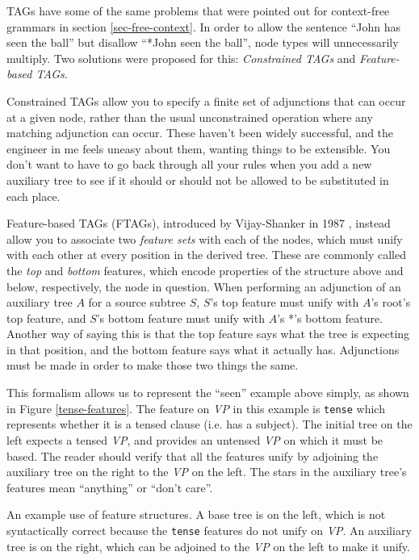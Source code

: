 \documentclass[12pt]{article}
\newcommand{\defn}[1]{\textit{#1}}
\begin{document}
TAGs have some of the same problems that were pointed out for
context-free grammars in section \ref{sec-free-context}.  In order to
allow the sentence ``John has seen the ball'' but disallow ``*John seen
the ball'', node types will unnecessarily multiply.  Two solutions were
proposed for this: \defn{Constrained TAGs} and \defn{Feature-based
TAGs}.

Constrained TAGs allow you to specify a finite set of adjunctions that
can occur at a given node, rather than the usual unconstrained operation
where any matching adjunction can occur.  These haven't been widely
successful, and the engineer in me feels uneasy about them, wanting
things to be extensible.  You don't want to have to go back through all
your rules when you add a new auxiliary tree to see if it should or
should not be allowed to be substituted in each place.

Feature-based TAGs (FTAGs), introduced by Vijay-Shanker in 1987
\cite{Vijay-Shanker-1987}, instead allow you to associate two
\defn{feature sets} with each of the nodes, which must unify with each
other at every position in the derived tree.  These are commonly called
the \defn{top} and \defn{bottom} features, which encode properties of
the structure above and below, respectively, the node in question.  When
performing an adjunction of an auxiliary tree $A$ for a source subtree
$S$, $S$'s top feature must unify with $A$'s root's top feature, and
$S$'s bottom feature must unify with $A$'s *'s bottom feature.  Another
way of saying this is that the top feature says what the tree is
expecting in that position, and the bottom feature says what it actually
has.  Adjunctions must be made in order to make those two things the
same.

This formalism allows us to represent the ``seen'' example above simply,
as shown in Figure \ref{tense-features}.  The feature on \textit{VP} in
this example is \texttt{tense} which represents whether it is a tensed
clause (i.e. has a subject).  The initial tree on the left expects a
tensed \textit{VP}, and provides an untensed \textit{VP} on which it
must be based.  The reader should verify that all the features unify by
adjoining the auxiliary tree on the right to the \textit{VP} on the
left.  The stars in the auxiliary tree's features mean ``anything'' or
``don't care''.

\begin{Figure}
\begin{center}
\end{center}
\caption{An example use of feature structures.  A base tree is on the
left, which is not syntactically correct because the \texttt{tense}
features do not unify on \textit{VP}.  An auxiliary tree is on the
right, which can be adjoined to the \textit{VP} on the left to make
it unify.}
\label{tense-features}
\end{Figure}
\end{document}
